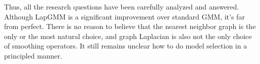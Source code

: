 \documentclass[10pt,journal,compsoc]{IEEEtran}
\begin{document}
Thus, all the research questions have been carefully analyzed and answered. Although LapGMM is a significant improvement over standard GMM, it's far from perfect. There is no reason to believe that the nearest neighbor graph is the only or the most natural choice, and graph Laplacian is also not the only choice of smoothing operators. It still remains unclear how to do model selection in a principled manner.



%





\end{document}
